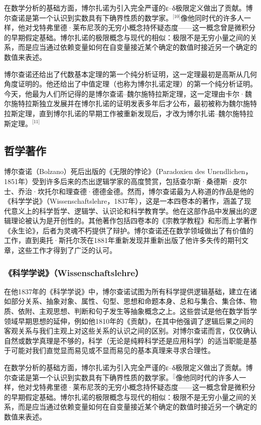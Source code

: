 在数学分析的基础方面，博尔扎诺为引入完全严谨的ε–δ极限定义做出了贡献。博尔查诺是第一个认识到实数具有下确界性质的数学家。\(^\text{[10]}\)像他同时代的许多人一样，他对戈特弗里德·莱布尼茨的无穷小概念持怀疑态度——这一概念曾是微积分的早期假定基础。博尔扎诺的极限概念与现代的相似：极限不是无穷小量之间的关系，而是应当通过依赖变量如何在自变量接近某个确定的数值时接近另一个确定的数值来表述。

博尔查诺还给出了代数基本定理的第一个纯分析证明，这一定理最初是高斯从几何角度证明的。他还给出了中值定理（也称为博尔扎诺定理）的第一个纯分析证明。今天，他最为人们所记得的是博尔查诺–魏尔施特拉斯定理，这一定理由卡尔·魏尔施特拉斯独立发展并在博尔扎诺的证明发表多年后才公布，最初被称为魏尔施特拉斯定理，直到博尔扎诺的早期工作被重新发现后，才改为博尔扎诺–魏尔施特拉斯定理。\(^\text{[11]}\)
\subsection{哲学著作}  
博尔查诺（Bolzano）死后出版的《无限的悖论》（Paradoxien des Unendlichen，1851年）受到许多后来的杰出逻辑学家的高度赞赏，包括查尔斯·桑德斯·皮尔士、乔治·坎托尔和理查德·德德金德。然而，博尔查诺最为人称道的作品是他的《科学学说》（Wissenschaftslehre，1837年），这是一本四卷本的著作，涵盖了现代意义上的科学哲学、逻辑学、认识论和科学教育学。他在这部作品中发展出的逻辑理论被认为是开创性的。其他著作包括四卷本的《宗教学教程》和形而上学著作《永生论》，后者为灵魂不朽提供了辩护。博尔查诺还在数学领域做出了有价值的工作，直到奥托·斯托尔茨在1881年重新发现并重新出版了他许多失传的期刊文章，这些工作才得到了广泛的认可。
\subsubsection{《科学学说》（Wissenschaftslehre）}  
在他1837年的《科学学说》中，博尔查诺试图为所有科学提供逻辑基础，建立在诸如部分关系、抽象对象、属性、句型、思想和命题本身、总和与集合、集合体、物质、依附、主观思想、判断和句子发生等抽象概念之上。这些尝试是他在数学哲学领域早期思想的延伸，例如他1810年的《贡献》，在其中他强调了逻辑后果之间的客观关系与我们主观上对这些关系的认识之间的区别。对博尔查诺而言，仅仅确认自然或数学真理是不够的，科学（无论是纯粹科学还是应用科学）的适当职能是基于可能对我们直觉显而易见或不显而易见的基本真理来寻求合理性。

在数学分析的基础方面，博尔扎诺为引入完全严谨的ε–δ极限定义做出了贡献。博尔查诺是第一个认识到实数具有下确界性质的数学家。\(^\text{[]}\)像他同时代的许多人一样，他对戈特弗里德·莱布尼茨的无穷小概念持怀疑态度——这一概念曾是微积分的早期假定基础。博尔扎诺的极限概念与现代的相似：极限不是无穷小量之间的关系，而是应当通过依赖变量如何在自变量接近某个确定的数值时接近另一个确定的数值来表述。

